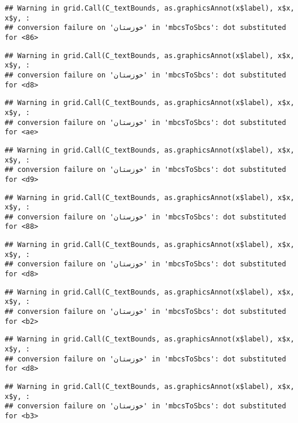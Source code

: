 \documentclass[
]{article}
\begin{document}
\begin{verbatim}
## Warning in grid.Call(C_textBounds, as.graphicsAnnot(x$label), x$x, x$y, :
## conversion failure on 'خوزستان' in 'mbcsToSbcs': dot substituted for <86>
\end{verbatim}

\begin{verbatim}
## Warning in grid.Call(C_textBounds, as.graphicsAnnot(x$label), x$x, x$y, :
## conversion failure on 'خوزستان' in 'mbcsToSbcs': dot substituted for <d8>
\end{verbatim}

\begin{verbatim}
## Warning in grid.Call(C_textBounds, as.graphicsAnnot(x$label), x$x, x$y, :
## conversion failure on 'خوزستان' in 'mbcsToSbcs': dot substituted for <ae>
\end{verbatim}

\begin{verbatim}
## Warning in grid.Call(C_textBounds, as.graphicsAnnot(x$label), x$x, x$y, :
## conversion failure on 'خوزستان' in 'mbcsToSbcs': dot substituted for <d9>
\end{verbatim}

\begin{verbatim}
## Warning in grid.Call(C_textBounds, as.graphicsAnnot(x$label), x$x, x$y, :
## conversion failure on 'خوزستان' in 'mbcsToSbcs': dot substituted for <88>
\end{verbatim}

\begin{verbatim}
## Warning in grid.Call(C_textBounds, as.graphicsAnnot(x$label), x$x, x$y, :
## conversion failure on 'خوزستان' in 'mbcsToSbcs': dot substituted for <d8>
\end{verbatim}

\begin{verbatim}
## Warning in grid.Call(C_textBounds, as.graphicsAnnot(x$label), x$x, x$y, :
## conversion failure on 'خوزستان' in 'mbcsToSbcs': dot substituted for <b2>
\end{verbatim}

\begin{verbatim}
## Warning in grid.Call(C_textBounds, as.graphicsAnnot(x$label), x$x, x$y, :
## conversion failure on 'خوزستان' in 'mbcsToSbcs': dot substituted for <d8>
\end{verbatim}

\begin{verbatim}
## Warning in grid.Call(C_textBounds, as.graphicsAnnot(x$label), x$x, x$y, :
## conversion failure on 'خوزستان' in 'mbcsToSbcs': dot substituted for <b3>
\end{verbatim}
\end{document}
